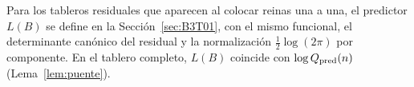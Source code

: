 Para los tableros residuales que aparecen al colocar reinas una a una, el predictor $L(B)$ se define en
la Sección~\ref{sec:B3T01}, con el mismo funcional, el determinante canónico del residual y la
normalización $\tfrac12\log(2\pi)$ por componente. En el tablero completo, $L(B)$ coincide con
$\log Q_{\rm pred}(n)$ (Lema~\ref{lem:puente}).

